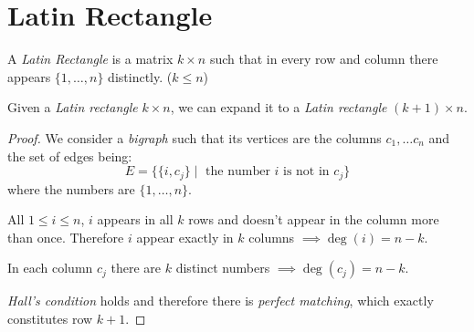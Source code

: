 \documentclass[00_complete]{subfiles}
\begin{document}
\section{Latin Rectangle}
\begin{definition}
    A \emph{Latin Rectangle} is a matrix $k\times n$ such that in every row and
    column there appears $\{1,\dots,n\}$ distinctly. ($k \leq n$)
\end{definition}
\begin{claim}
    Given a \emph{Latin rectangle} $k\times n$, we can expand it to a
    \emph{Latin rectangle} $(k+1)\times n$.
\end{claim}
\begin{proof}
    We consider a \emph{bigraph} such that its vertices are the columns
    $c_1,\dots c_n$ and the set of edges being:
    $$E=\{\{i,c_j\}\mid \text{ the number $i$ is not in $c_j$}\}$$
    where the numbers are $\{1,\dots,n\}$.

    All $1 \leq i \leq n$, $i$ appears in all $k$ rows and doesn't appear in
    the column more than once. Therefore $i$ appear exactly in $k$ columns
    $\implies \deg(i)=n-k$.

    In each column $c_j$ there are $k$ distinct numbers $\implies
    \deg(c_j)=n-k$.

    \emph{Hall's condition} holds and therefore there is \emph{perfect
    matching}, which exactly constitutes row $k+1$.
\end{proof}
\end{document}
